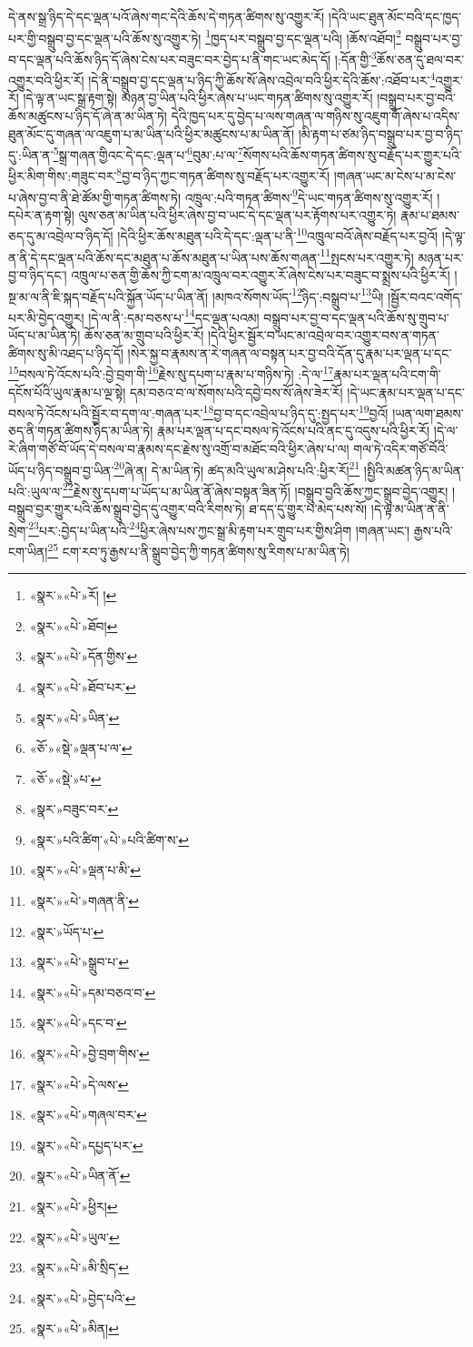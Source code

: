 དེ་ནས་སྒྲ་ཉིད་དེ་དང་ལྡན་པའོ་ཞེས་གང་དེའི་ཆོས་དེ་གཏན་ཚིགས་སུ་འགྱུར་རོ། །དེའི་ཡང་ཐུན་མོང་བའི་དང་ཁྱད་པར་གྱི་བསྒྲུབ་བྱ་དང་ལྡན་པའི་ཆོས་སུ་འགྱུར་ཏེ། \footnote{«སྣར་»«པེ་»རོ། ། }ཁྱད་པར་བསྒྲུབ་བྱ་དང་ལྡན་པའི། །ཆོས་འཐོབ།\footnote{«སྣར་»«པེ་»ཐོབ།} བསྒྲུབ་པར་བྱ་བ་དང་ལྡན་པའི་ཆོས་ཉིད་དོ་ཞེས་ངེས་པར་བཟུང་བར་བྱེད་པ་ནི་གང་ཡང་མེད་དོ། །:དོན་གྱི་\footnote{«སྣར་»«པེ་»དོན་གྱིས་}ཆོས་ཅན་དུ་ཐལ་བར་འགྱུར་བའི་ཕྱིར་རོ། །དེ་ནི་བསྒྲུབ་བྱ་དང་ལྡན་པ་ཉིད་ཀྱི་ཆོས་སོ་ཞེས་འབྲེལ་བའི་ཕྱིར་དེའི་ཆོས་:འཐོབ་པར་\footnote{«སྣར་»«པེ་»ཐོབ་པར་}འགྱུར་རོ། །དེ་ལྟ་ན་ཡང་སྒྲ་རྟག་སྟེ། མཉན་བྱ་ཡིན་པའི་ཕྱིར་ཞེས་པ་ཡང་གཏན་ཚིགས་སུ་འགྱུར་རོ། །བསྒྲུབ་པར་བྱ་བའི་ཆོས་མཚུངས་པ་ཉིད་དོ་ཞེ་ན་མ་ཡིན་ཏེ། དེའི་ཁྱད་པར་དུ་བྱེད་པ་ལས་གཞན་ལ་གཉིས་སུ་འཇུག་གོ་ཞེས་པ་འདིས་ཐུན་མོང་དུ་གཞན་ལ་འཇུག་པ་མ་ཡིན་པའི་ཕྱིར་མཚུངས་པ་མ་ཡིན་ནོ། །མི་རྟག་པ་ཙམ་ཉིད་བསྒྲུབ་པར་བྱ་བ་ཉིད་དུ་:ཡིན་ན་\footnote{«སྣར་»«པེ་»ཡིན་}སྒྲ་གཞན་གྱིའང་དེ་དང་:ལྡན་པ་\footnote{«ཅོ་»«སྡེ་»ལྡན་པ་ལ་}བུམ་:པ་ལ་\footnote{«ཅོ་»«སྡེ་»པ་}སོགས་པའི་ཆོས་གཏན་ཚིགས་སུ་བརྗོད་པར་གྱུར་པའི་ཕྱིར་མིག་གིས་:གཟུང་བར་\footnote{«སྣར་»བཟུང་བར་}བྱ་བ་ཉིད་ཀྱང་གཏན་ཚིགས་སུ་བརྗོད་པར་འགྱུར་རོ། །གཞན་ཡང་མ་ངེས་པ་མ་ངེས་པ་ཞེས་བྱ་བ་ནི་ཐེ་ཚོམ་གྱི་གཏན་ཚིགས་ཏེ། འཁྲུལ་:པའི་གཏན་ཚིགས་\footnote{«སྣར་»པའི་ཚིག་«པེ་»པའི་ཚིག་ས་}དེ་ཡང་གཏན་ཚིགས་སུ་འགྱུར་རོ། །དཔེར་ན་རྟག་སྟེ། ལུས་ཅན་མ་ཡིན་པའི་ཕྱིར་ཞེས་བྱ་བ་ཡང་དེ་དང་ལྡན་པར་རྟོགས་པར་འགྱུར་ཏེ། རྣམ་པ་ཐམས་ཅད་དུ་མ་འབྲེལ་བ་ཉིད་དོ། །དེའི་ཕྱིར་ཆོས་མཐུན་པའི་དེ་དང་:ལྡན་པ་ནི་\footnote{«སྣར་»«པེ་»ལྡན་པ་མི་}འཁྲུལ་བའོ་ཞེས་བརྗོད་པར་བྱའོ། །དེ་ལྟ་ན་ནི་དེ་དང་ལྡན་པའི་ཆོས་དང་མཐུན་པ་ཆོས་མཐུན་པ་ཡིན་པས་ཆོས་གཞན་\footnote{«སྣར་»«པེ་»གཞན་ནི་}སྤངས་པར་འགྱུར་ཏེ། མཉན་པར་བྱ་བ་ཉིད་དང་། འཁྲུལ་པ་ཅན་གྱི་ཆོས་ཀྱི་ངག་མ་འཁྲུལ་བར་འགྱུར་རོ་ཞེས་ངེས་པར་བཟུང་བ་སྨྲས་པའི་ཕྱིར་རོ། །སྔ་མ་ལ་ནི་ཇི་སྐད་བརྗོད་པའི་སྐྱོན་ཡོད་པ་ཡིན་ནོ། །མཁའ་སོགས་ཡོད་\footnote{«སྣར་»ཡོད་པ་}ཉིད་:བསྒྲུབ་པ་\footnote{«སྣར་»«པེ་»སྒྲུབ་པ་}ཡི། །སྦྱོར་བའང་འགོད་པར་མི་བྱེད་འགྱུར། །དེ་ལ་ནི་:དམ་བཅས་པ་\footnote{«སྣར་»«པེ་»དམ་བཅའ་བ་}དང་ལྡན་པའམ། བསྒྲུབ་པར་བྱ་བ་དང་ལྡན་པའི་ཆོས་སུ་གྲུབ་པ་ཡོད་པ་མ་ཡིན་ཏེ། ཆོས་ཅན་མ་གྲུབ་པའི་ཕྱིར་རོ། །དེའི་ཕྱིར་སྦྱོར་བ་ཡང་མ་འབྲེལ་བར་འགྱུར་བས་ན་གཏན་ཚིགས་སུ་མི་འཐད་པ་ཉིད་དོ། །སེར་སྐྱ་བ་རྣམས་ན་རེ་གཞན་ལ་བསྟན་པར་བྱ་བའི་དོན་དུ་རྣམ་པར་ལྡན་པ་དང་\footnote{«སྣར་»«པེ་»དང་བ་}བསལ་ཏེ་འོངས་པའི་:བྱེ་བྲག་གི་\footnote{«སྣར་»«པེ་»བྱེ་བྲག་གིས་}རྗེས་སུ་དཔག་པ་རྣམ་པ་གཉིས་ཏེ། :དེ་ལ་\footnote{«སྣར་»«པེ་»དེ་ལས་}རྣམ་པར་ལྡན་པའི་ངག་གི་དངོས་པོའི་ཡུལ་རྣམ་པ་ལྔ་སྟེ། དམ་བཅའ་བ་ལ་སོགས་པའི་དབྱེ་བས་སོ་ཞེས་ཟེར་རོ། །དེ་ཡང་རྣམ་པར་ལྡན་པ་དང་བསལ་ཏེ་འོངས་པའི་སྦྱོར་བ་དག་ལ་:གཞན་པར་\footnote{«སྣར་»«པེ་»གཞལ་བར་}བྱ་བ་དང་འབྲེལ་པ་ཉིད་དུ་:སྤྱད་པར་\footnote{«སྣར་»«པེ་»དཔྱད་པར་}བྱའོ། །ཡན་ལག་ཐམས་ཅད་ནི་གཏན་ཚིགས་ཉིད་མ་ཡིན་ཏེ། རྣམ་པར་ལྡན་པ་དང་བསལ་ཏེ་འོངས་པའི་ནང་དུ་འདུས་པའི་ཕྱིར་རོ། །དེ་ལ་རེ་ཞིག་གཙོ་བོ་ཡོད་དེ་བསལ་བ་རྣམས་དང་རྗེས་སུ་འགྲོ་བ་མཐོང་བའི་ཕྱིར་ཞེས་པ་ལ། གལ་ཏེ་འདིར་གཙོ་བོའི་ཡོད་པ་ཉིད་བསྒྲུབ་བྱ་ཡིན་\footnote{«སྣར་»«པེ་»ཡིན་ནོ་}ཞེ་ན། དེ་མ་ཡིན་ཏེ། ཚད་མའི་ཡུལ་མ་ཤེས་པའི་:ཕྱིར་རོ།\footnote{«སྣར་»«པེ་»ཕྱིར།} །སྤྱིའི་མཚན་ཉིད་མ་ཡིན་པའི་:ཡུལ་ལ་\footnote{«སྣར་»«པེ་»ཡུལ་}རྗེས་སུ་དཔག་པ་ཡོད་པ་མ་ཡིན་ནོ་ཞེས་བསྟན་ཟིན་ཏོ། །བསྒྲུབ་བྱའི་ཆོས་ཀྱང་སྒྲུབ་བྱེད་འགྱུར། །བསྒྲུབ་བྱར་གྱུར་པའི་ཆོས་སྒྲུབ་བྱེད་དུ་འགྱུར་བའི་རིགས་ཏེ། ཐ་དད་དུ་གྱུར་པ་མེད་པས་སོ། །དེ་ལྟ་མ་ཡིན་ན་ནི་སྲེག་\footnote{«སྣར་»«པེ་»མི་སྲིད་}པར་:བྱེད་པ་ཡིན་པའི་\footnote{«སྣར་»«པེ་»བྱེད་པའི་}ཕྱིར་ཞེས་པས་ཀྱང་སྒྲ་མི་རྟག་པར་གྲུབ་པར་གྱིས་ཤིག །གཞན་ཡང་། རྒྱས་པའི་ངག་ཡིན།\footnote{«སྣར་»«པེ་»མིན།} ངག་རབ་ཏུ་རྒྱས་པ་ནི་སྒྲུབ་བྱེད་ཀྱི་གཏན་ཚིགས་སུ་རིགས་པ་མ་ཡིན་ཏེ། 